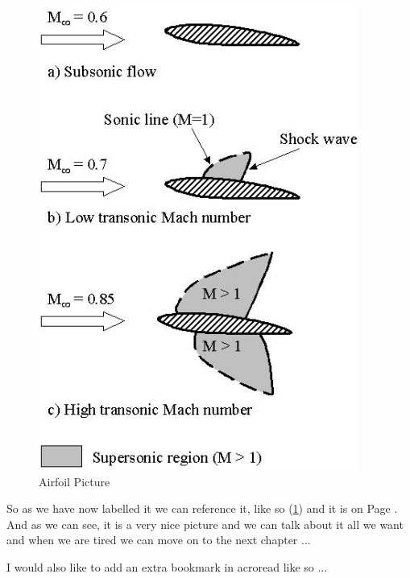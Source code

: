 \begin{figure}[!htbp]
\begin{center}
      \includegraphics[bb = 92 86 545 742, height=6in]{aflow}
    \fi
    \caption{Airfoil Picture}
    \label{FigAir}
  \end{center}
\end{figure}


So as we have now labelled it we can reference it, like so (\ref{FigAir}) and it
is on Page \pageref{FigAir}. And as we can see, it is a very nice picture and we
can talk about it all we want and when we are tired we can move on to the next
chapter ...

I would also like to add an extra bookmark in acroread like so ...
\ifpdf
\fi


